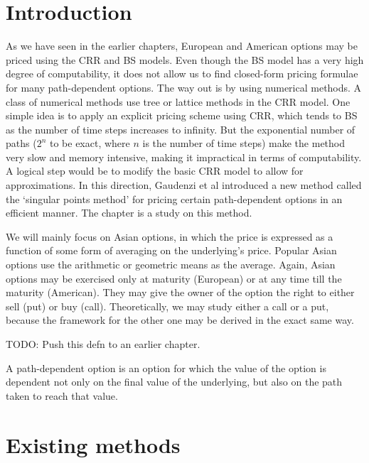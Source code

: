 
\section{Introduction}
\label{sec:sp-intro}
As we have seen in the earlier chapters, European and American options may be priced using the CRR and BS models. Even though the BS model has a very high degree of computability, it does not allow us to find closed-form pricing formulae for many path-dependent options. The way out is by using numerical methods. A class of numerical methods use tree or lattice methods in the CRR model. One simple idea is to apply an explicit pricing scheme using CRR, which tends to BS as the number of time steps increases to infinity. But the exponential number of paths ($2^n$ to be exact, where $n$ is the number of time steps) make the method very slow and memory intensive, making it impractical in terms of computability. A logical step would be to modify the basic CRR model to allow for approximations. In this direction, Gaudenzi et al\cite{Gaudenzi2010} introduced a new method called the `singular points method' for pricing certain path-dependent options in an efficient manner. The chapter is a study on this method.

We will mainly focus on Asian options, in which the price is expressed as a function of some form of averaging on the underlying's price. Popular Asian options use the arithmetic or geometric means as the average. Again, Asian options may be exercised only at maturity (European) or at any time till the maturity (American). They may give the owner of the option the right to either sell (put) or buy (call). Theoretically, we may study either a call or a put, because the framework for the other one may be derived in the exact same way.

TODO: Push this defn to an earlier chapter.
\begin{dfn}
	A path-dependent option is an option for which the value of the option is dependent not only on the final value of the underlying, but also on the path taken to reach that value.
\end{dfn}



\section{Existing methods}
\label{sec:existing-methods}

